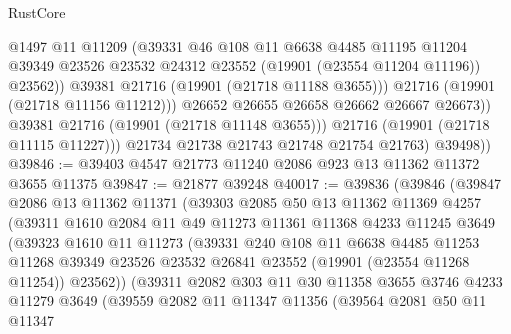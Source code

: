\begin{lexlean}{RustCore}
\begin{coremodule}
                        @1497
                        @11
                        @11209
                        (@39331
                          @46
                          @108
                          @11
                          @6638
                          @4485
                          @11195
                          @11204
                          @39349
                          @23526
                          @23532
                          @24312
                          @23552
                          (@19901 (@23554 @11204 @11196))
                          @23562))
                      @39381
                      @21716
                      (@19901 (@21718 @11188 @3655)))
                    @21716
                    (@19901 (@21718 @11156 @11212)))
                  @26652
                  @26655
                  @26658
                  @26662
                  @26667
                  @26673))
              @39381
              @21716
              (@19901 (@21718 @11148 @3655)))
            @21716
            (@19901 (@21718 @11115 @11227)))
          @21734
          @21738
          @21743
          @21748
          @21754
          @21763)
        @39498))
@39846 := @39403 @4547 @21773 @11240 @2086 @923 @13 @11362 @11372 @3655 @11375
@39847 := @21877 @39248
@40017 := @39836
    (@39846
      (@39847
        @2086
        @13
        @11362
        @11371
        (@39303
          @2085
          @50
          @13
          @11362
          @11369
          @4257
          (@39311
            @1610
            @2084
            @11
            @49
            @11273
            @11361
            @11368
            @4233
            @11245
            @3649
            (@39323
              @1610
              @11
              @11273
              (@39331
                @240
                @108
                @11
                @6638
                @4485
                @11253
                @11268
                @39349
                @23526
                @23532
                @26841
                @23552
                (@19901 (@23554 @11268 @11254))
                @23562))
            (@39311
              @2082
              @303
              @11
              @30
              @11358
              @3655
              @3746
              @4233
              @11279
              @3649
              (@39559
                @2082
                @11
                @11347
                @11356
                (@39564
                  @2081
                  @50
                  @11
                  @11347

\end{coremodule}
\end{lexlean}

